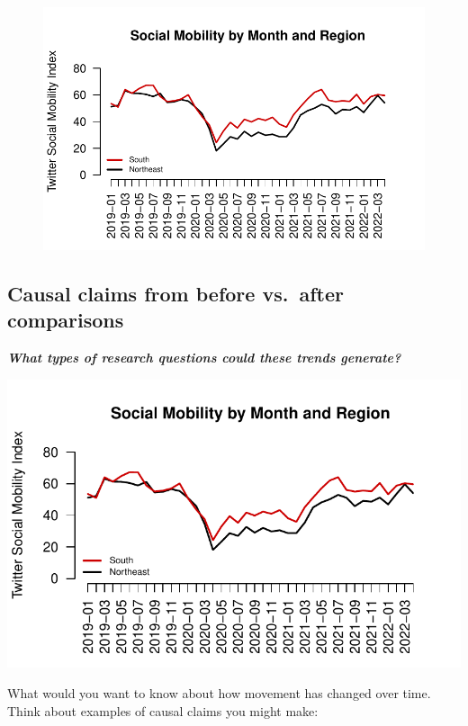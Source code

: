 \documentclass[
  letterpaper,
  DIV=11,
  numbers=noendperiod]{scrreprt}
\begin{document}
\begin{figure}[H]

{\centering \includegraphics{05-Causalityii_files/figure-pdf/unnamed-chunk-18-1.pdf}

}

\end{figure}

\hypertarget{causal-claims-from-before-vs.-after-comparisons}{%
\subsection{Causal claims from before vs.~after
comparisons}\label{causal-claims-from-before-vs.-after-comparisons}}

\textbf{\emph{What types of research questions could these trends
generate?}}

\includegraphics{05-Causalityii_files/figure-pdf/unnamed-chunk-19-1.pdf}

What would you want to know about how movement has changed over time.
Think about examples of causal claims you might make:
\end{document}
